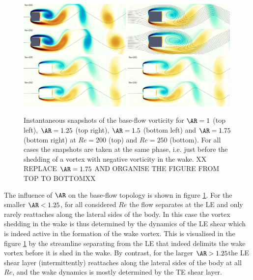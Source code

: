 \begin{figure}
  \centering
  \includegraphics[width=0.49\textwidth]{./fig/AR1/snap/snap.0030.png}
  \includegraphics[width=0.49\textwidth]{./fig/AR1p25/snap/snap.0030.png}
  \includegraphics[width=0.49\textwidth]{./fig/AR1p5/snap/snap.0030.png}
  \includegraphics[width=0.49\textwidth]{./fig/AR1p5/snap/snap.0030.png}  
  \caption{Instantaneous snapshots of the base-flow vorticity for $\AR=1$ (top left), $\AR=1.25$ (top right), $\AR=1.5$ (bottom left) and $\AR=1.75$ (bottom right) at $Re=200$ (top) and $Re=250$ (bottom). For all cases the snapshots are taken at the same phase, i.e. just before the shedding of a vortex with negative vorticity in the wake. XX REPLACE $\AR=1.75$ AND ORGANISE THE FIGURE FROM TOP TO BOTTOMXX}
  \label{fig:bf-short}
\end{figure}
%
The influence of $\AR$ on the base-flow topology is shown in figure \ref{fig:bf-short}. For the smaller $\AR < 1.25$, for all considered $Re$ the flow separates at the LE and only rarely reattaches along the lateral sides of the body. In this case the vortex shedding in the wake is thus determined by the dynamics of the LE shear which is indeed active in the formation of the wake vortex. This is visualised in the figure \ref{fig:bf-short} by the streamline separating from the LE that indeed delimits the wake vortex before it is shed in the wake. By contrast, for the larger $\AR>1.25$the LE shear layer (intermittently) reattaches along the lateral sides of the body at all $Re$, and the wake dynamics is mostly determined by the TE shear layer.

